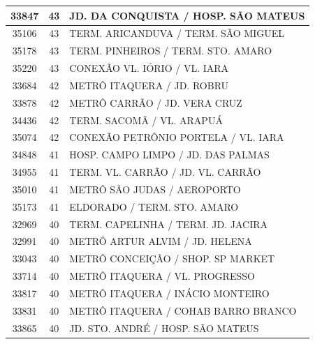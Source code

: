 \documentclass[
	12pt,				%
	oneside,			%
	a4paper,			%
	english,			%
	brazil				%
	]{abntex2ppgsi}
\begin{document}
\begin{apendicesenv}
\begin{longtable}{c|c|p{7cm}}
    33847 & 43    & JD. DA CONQUISTA / HOSP. SÃO MATEUS \\
\hline

    35106 & 43    & TERM. ARICANDUVA / TERM. SÃO MIGUEL \\
\hline

    35178 & 43    & TERM. PINHEIROS / TERM. STO. AMARO \\
\hline

    35220 & 43    & CONEXÃO VL. IÓRIO / VL. IARA \\
\hline

    33684 & 42    & METRÔ ITAQUERA / JD. ROBRU \\
\hline

    33878 & 42    & METRÔ CARRÃO / JD. VERA CRUZ  \\
\hline

    34436 & 42    & TERM. SACOMÃ / VL. ARAPUÁ \\
\hline

    35074 & 42    & CONEXÃO PETRÔNIO PORTELA / VL. IARA \\
\hline

    34848 & 41    & HOSP. CAMPO LIMPO / JD. DAS PALMAS \\
\hline

    34955 & 41    & TERM. VL. CARRÃO / JD. VL. CARRÃO \\
\hline

    35010 & 41    & METRÔ SÃO JUDAS / AEROPORTO \\
\hline

    35173 & 41    & ELDORADO / TERM. STO. AMARO \\
\hline

    32969 & 40    & TERM. CAPELINHA / TERM. JD. JACIRA \\
\hline

    32991 & 40    & METRÔ ARTUR ALVIM / JD. HELENA \\
\hline

    33043 & 40    & METRÔ CONCEIÇÃO / SHOP. SP MARKET \\
\hline

    33714 & 40    & METRÔ ITAQUERA / VL. PROGRESSO \\
\hline

    33817 & 40    & METRÔ ITAQUERA / INÁCIO MONTEIRO \\
\hline

    33831 & 40    & METRÔ ITAQUERA / COHAB BARRO BRANCO \\
\hline

    33865 & 40    & JD. STO. ANDRÉ / HOSP. SÃO MATEUS \\
\hline


\end{longtable}
\end{apendicesenv}
\end{document}
